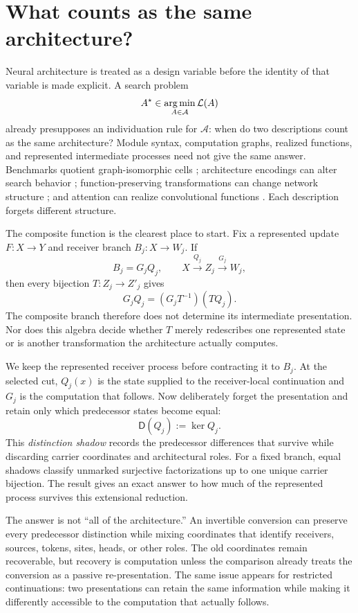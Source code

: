 \section{What counts as the same architecture?}\label{sec:architecture-individuation}

Neural architecture is treated as a design variable before the identity of that variable is made explicit. A search problem
\[
A^\star\in\operatorname*{arg\,min}_{A\in\mathcal A}\mathcal L(A)
\]
already presupposes an individuation rule for $\mathcal A$: when do two descriptions count as the same architecture? Module syntax, computation graphs, realized functions, and represented intermediate processes need not give the same answer. Benchmarks quotient graph-isomorphic cells \citep{ying2019nasbench}; architecture encodings can alter search behavior \citep{white2020encodings}; function-preserving transformations can change network structure \citep{wei2016networkmorphism}; and attention can realize convolutional functions \citep{cordonnier2020relationship}. Each description forgets different structure.

The composite function is the clearest place to start. Fix a represented update $F:X\to Y$ and receiver branch $B_j:X\to W_j$. If
\begin{equation}\label{eq:intro-factorization-v13}
B_j=G_jQ_j,
\qquad
X\xrightarrow{Q_j}Z_j\xrightarrow{G_j}W_j,
\end{equation}
then every bijection $T:Z_j\to Z'_j$ gives
\[
G_jQ_j=(G_jT^{-1})(TQ_j).
\]
The composite branch therefore does not determine its intermediate presentation. Nor does this algebra decide whether $T$ merely redescribes one represented state or is another transformation the architecture actually computes.

We keep the represented receiver process before contracting it to $B_j$. At the selected cut, $Q_j(x)$ is the state supplied to the receiver-local continuation and $G_j$ is the computation that follows. Now deliberately forget the presentation and retain only which predecessor states become equal:
\[
\boxed{\mathsf D(Q_j):=\ker Q_j.}
\]
This \emph{distinction shadow} records the predecessor differences that survive while discarding carrier coordinates and architectural roles. For a fixed branch, equal shadows classify unmarked surjective factorizations up to one unique carrier bijection. The result gives an exact answer to how much of the represented process survives this extensional reduction.

The answer is not ``all of the architecture.'' An invertible conversion can preserve every predecessor distinction while mixing coordinates that identify receivers, sources, tokens, sites, heads, or other roles. The old coordinates remain recoverable, but recovery is computation unless the comparison already treats the conversion as a passive re-presentation. The same issue appears for restricted continuations: two presentations can retain the same information while making it differently accessible to the computation that actually follows.

